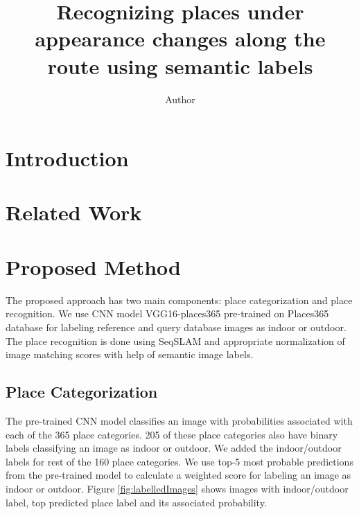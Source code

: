 \documentclass[twocolumn]{article}
\title{Recognizing places under appearance changes along the route using semantic labels}
\author{Author}
\begin{document}
\maketitle

\section{Introduction}

\section{Related Work}

\section{Proposed Method}
The proposed approach has two main components: place categorization and place recognition. We use CNN model VGG16-places365 \cite{cnnPlaces365Github} pre-trained on Places365 database \cite{zhou2014learning} for labeling reference and query database images as indoor or outdoor. The place recognition is done using SeqSLAM \cite{Milford2012} and appropriate normalization of image matching scores with help of semantic image labels.

\subsection{Place Categorization}

The pre-trained CNN model classifies an image with probabilities associated with each of the 365 place categories. 205 of these place categories also have binary labels classifying an image as indoor or outdoor. We added the indoor/outdoor labels for rest of the 160 place categories. We use top-5 most probable predictions from the pre-trained model to calculate a weighted score for labeling an image as indoor or outdoor. Figure \ref{fig:labelledImages} shows images with indoor/outdoor label, top predicted place label and its associated probability.
\end{document}
